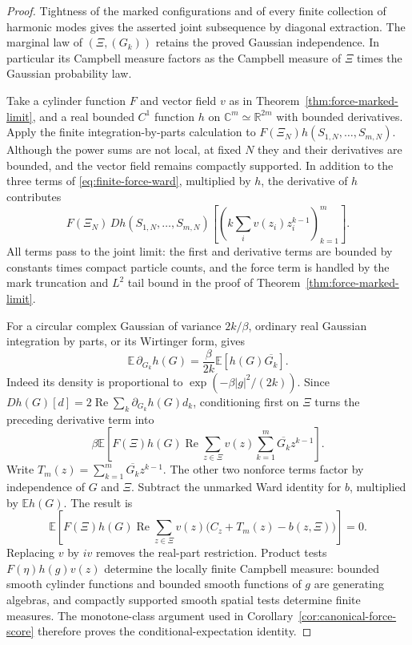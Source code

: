 \documentclass[11pt,a4paper]{article}
\numberwithin{equation}{section}
\theoremstyle{definition}
\theoremstyle{remark}
\newcommand{\E}{\mathbb E}
\newcommand{\C}{\mathbb C}
\newcommand{\R}{\mathbb R}
\begin{document}
\begin{proof}
Tightness of the marked configurations and of every finite collection
of harmonic modes gives the asserted joint subsequence by diagonal
extraction. The marginal law of $(\Xi,(G_k))$ retains the proved
Gaussian independence. In particular its Campbell measure factors as
the Campbell measure of $\Xi$ times the Gaussian probability law.

Take a cylinder function $F$ and vector field $v$ as in
Theorem~\ref{thm:force-marked-limit}, and a real bounded $C^1$ function
$h$ on $\C^m\simeq\R^{2m}$ with bounded derivatives. Apply the finite
integration-by-parts calculation to
$F(\Xi_N)h(S_{1,N},\ldots,S_{m,N})$. Although the power sums are not
local, at fixed $N$ they and their derivatives are bounded, and the
vector field remains compactly supported. In addition to the three
terms of \eqref{eq:finite-force-ward}, multiplied by $h$, the derivative
of $h$ contributes
\[
 F(\Xi_N)\,Dh(S_{1,N},\ldots,S_{m,N})
       \left[\left(k\sum_i v(z_i)z_i^{k-1}\right)_{k=1}^m\right].
\]
All terms pass to the joint limit: the first and derivative terms are
bounded by constants times compact particle counts, and the force term
is handled by the mark truncation and $L^2$ tail bound in the proof of
Theorem~\ref{thm:force-marked-limit}.

For a circular complex Gaussian of variance $2k/\beta$, ordinary real
Gaussian integration by parts, or its Wirtinger form, gives
\[
 \E\,\partial_{G_k}h(G)=\frac\beta{2k}\E[h(G)\overline{G_k}].
\]
Indeed its density is proportional to
$\exp(-\beta|g|^2/(2k))$. Since
$Dh(G)[d]=2\operatorname{Re}\sum_k\partial_{G_k}h(G)d_k$,
conditioning first on $\Xi$ turns the preceding derivative term into
\[
 \beta\E\left[F(\Xi)h(G)\operatorname{Re}
          \sum_{z\in\Xi}v(z)\sum_{k=1}^m\overline{G_k}z^{k-1}\right].
\]
Write $T_m(z)=\sum_{k=1}^m\overline{G_k}z^{k-1}$. The other two
nonforce terms factor by independence of $G$ and $\Xi$.
Subtract the unmarked Ward identity for $b$, multiplied by $\E h(G)$.
The result is
\[
 \E\left[F(\Xi)h(G)\operatorname{Re}
         \sum_{z\in\Xi}v(z)
                   \bigl(C_z+T_m(z)-b(z,\Xi)\bigr)\right]=0.
\]
Replacing $v$ by $iv$ removes the real-part restriction. Product tests
$F(\eta)h(g)v(z)$ determine the locally finite Campbell measure:
bounded smooth cylinder functions and bounded smooth functions of $g$
are generating algebras, and compactly supported smooth spatial tests
determine finite measures. The monotone-class argument used in
Corollary~\ref{cor:canonical-force-score} therefore proves the
conditional-expectation identity.


\end{proof}
\end{document}
